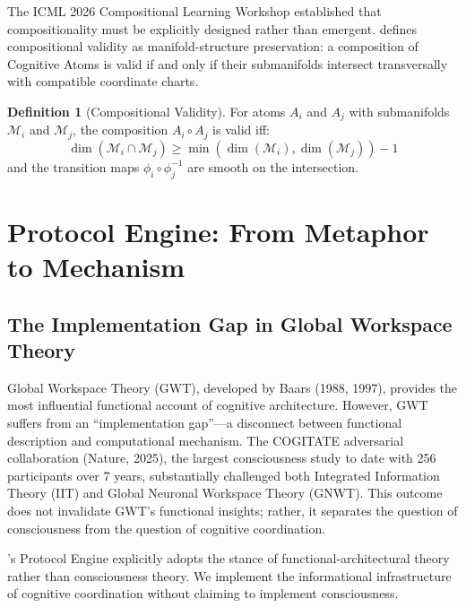 \documentclass[11pt,a4paper]{article}
\theoremstyle{definition}
\newtheorem{definition}{Definition}[section]
\theoremstyle{remark}
\newcommand{\CAA}{\text{CAA-X}}
\newcommand{\GWP}{\text{GWP}}
\newcommand{\M}{\mathcal{M}}
\begin{document}
The ICML 2026 Compositional Learning Workshop established that compositionality must be explicitly designed rather than emergent. \CAA{} defines compositional validity as manifold-structure preservation: a composition of Cognitive Atoms is valid if and only if their submanifolds intersect transversally with compatible coordinate charts.

\begin{definition}[Compositional Validity]\label{def:compositional-validity}
For atoms $A_i$ and $A_j$ with submanifolds $\M_i$ and $\M_j$, the composition $A_i \circ A_j$ is valid iff:
\begin{equation}
\dim(\M_i \cap \M_j) \geq \min(\dim(\M_i), \dim(\M_j)) - 1
\end{equation}
and the transition maps $\phi_i \circ \phi_j^{-1}$ are smooth on the intersection.
\end{definition}

\section{\GWP{} Protocol Engine: From Metaphor to Mechanism}\label{sec:gwp}

\subsection{The Implementation Gap in Global Workspace Theory}\label{subsec:implementation-gap}

Global Workspace Theory (GWT), developed by Baars (1988, 1997), provides the most influential functional account of cognitive architecture. However, GWT suffers from an ``implementation gap''---a disconnect between functional description and computational mechanism. The COGITATE adversarial collaboration (Nature, 2025), the largest consciousness study to date with 256 participants over 7 years, substantially challenged both Integrated Information Theory (IIT) and Global Neuronal Workspace Theory (GNWT). This outcome does not invalidate GWT's functional insights; rather, it separates the question of consciousness from the question of cognitive coordination.

\CAA{}'s \GWP{} Protocol Engine explicitly adopts the stance of functional-architectural theory rather than consciousness theory. We implement the informational infrastructure of cognitive coordination without claiming to implement consciousness.
\end{document}
